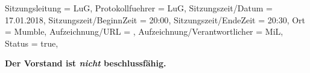 
\begin{Protokoll}{
        Sitzungsleitung                 = {LuG},             %
        Protokollfuehrer                = {LuG},              %
        Sitzungszeit/Datum              = {17.01.2018},       %
        Sitzungszeit/BeginnZeit         = {20:00},            %
        Sitzungszeit/EndeZeit           = {20:30},            %
        Ort                             = {Mumble},            %
        Aufzeichnung/URL                = {},                %
        Aufzeichnung/Verantwortlicher   = {MiL},                  %
        Status                          = {true},            %
    }
    
    \begin{Anwesenheitsliste}
    \end{Anwesenheitsliste}
    
    \textbf{Der Vorstand ist \emph{nicht} beschlussfähig.} 
    
    
\end{Protokoll}


